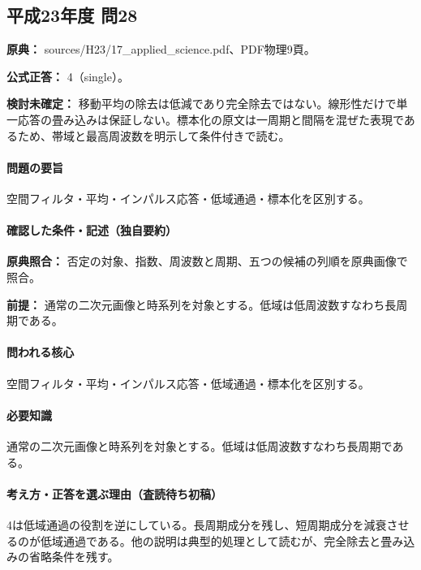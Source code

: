 \subsection{平成23年度 問28}
\label{q:h23-reg-applied-28}

\noindent\textbf{原典：} sources/H23/17\_applied\_science.pdf、PDF物理9頁。

\textbf{公式正答：} 4（single）。

\par\textbf{検討未確定：} 移動平均の除去は低減であり完全除去ではない。線形性だけで単一応答の畳み込みは保証しない。標本化の原文は一周期と間隔を混ぜた表現であるため、帯域と最高周波数を明示して条件付きで読む。

\paragraph{問題の要旨} 空間フィルタ・平均・インパルス応答・低域通過・標本化を区別する。

\paragraph{確認した条件・記述（独自要約）}\mbox{}\par

\noindent\textbf{原典照合：} 否定の対象、指数、周波数と周期、五つの候補の列順を原典画像で照合。\par

\noindent\textbf{前提：} 通常の二次元画像と時系列を対象とする。低域は低周波数すなわち長周期である。\par

\paragraph{問われる核心} 空間フィルタ・平均・インパルス応答・低域通過・標本化を区別する。

\paragraph{必要知識} 通常の二次元画像と時系列を対象とする。低域は低周波数すなわち長周期である。

\paragraph{考え方・正答を選ぶ理由（査読待ち初稿）} 4は低域通過の役割を逆にしている。長周期成分を残し、短周期成分を減衰させるのが低域通過である。他の説明は典型的処理として読むが、完全除去と畳み込みの省略条件を残す。

